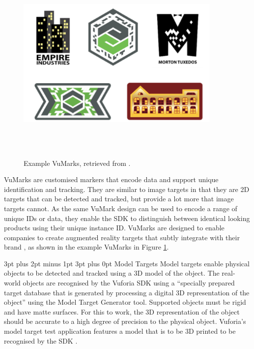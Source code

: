 \documentclass[12pt,a4paper,oneside]{article}
\makeatletter
\renewcommand\paragraph{\@startsection {paragraph}{1}{0mm} %
	                           {3pt plus 2pt minus 1pt} %
	                           {3pt plus 0pt} %
	                           {\normalfont}}
\makeatother
\begin{document}
\begin{figure}[!h]
	\centering
	\includegraphics[width=10cm,height=10cm,keepaspectratio]{images/examplevumarks}
	\caption[Example VuMarks]{Example VuMarks, retrieved from \footnotemark.}
	\label{fig_vumark}
\end{figure}

VuMarks are customised markers that encode data and support unique identification and tracking. They are similar to image targets in that they are 2D targets that can be detected and tracked, but provide a lot more that image targets cannot. As the same VuMark design can be used to encode a range of unique IDs or data, they enable the SDK to distinguish between identical looking products using their unique instance ID. VuMarks are designed to enable companies to create augmented reality targets that subtly integrate with their brand \cite{vuforiavumark}, as shown in the example VuMarks in Figure \ref{fig_vumark}.  

\paragraph{Model Targets}
Model targets enable physical objects to be detected and tracked using a 3D model of the object. The real-world objects are recognised by the Vuforia SDK using a ``specially prepared target database that is generated by processing a digital 3D representation of the object'' using the Model Target Generator tool. Supported objects must be rigid and have matte surfaces. For this to work, the 3D representation of the object should be accurate to a high degree of precision to the physical object. Vuforia's model target test application features a model that is to be 3D printed to be recognised by the SDK \cite{vuforiamodeltargets}.
\end{document}
